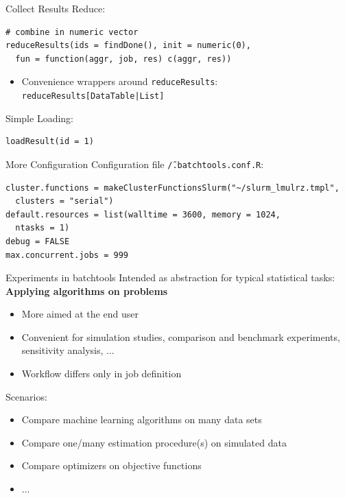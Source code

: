 \documentclass[11pt,compress,t,notes=noshow, aspectratio=169, xcolor=table]{beamer}
\begin{document}
\begin{frame}[fragile]{Collect Results}
  Reduce:
  
\begin{lstlisting}
# combine in numeric vector
reduceResults(ids = findDone(), init = numeric(0),
  fun = function(aggr, job, res) c(aggr, res))
\end{lstlisting}
  
  \begin{itemize}
    \item Convenience wrappers around \texttt{reduceResults}: \texttt{reduceResults[DataTable|List]}
  \end{itemize}
  Simple Loading:
  
\begin{lstlisting}
loadResult(id = 1)
\end{lstlisting}
  
\end{frame}

\begin{frame}[fragile]{More Configuration}
  Configuration file \texttt{\~/.batchtools.conf.R}:
  
\begin{lstlisting}
cluster.functions = makeClusterFunctionsSlurm("~/slurm_lmulrz.tmpl",
  clusters = "serial")
default.resources = list(walltime = 3600, memory = 1024,
  ntasks = 1)
debug = FALSE
max.concurrent.jobs = 999
\end{lstlisting}
  
\end{frame}

\begin{frame}[fragile]{Experiments in batchtools}
  Intended as abstraction for typical statistical tasks:
  \textbf{Applying algorithms on problems}
  \begin{itemize}
    \item More aimed at the end user
    \item Convenient for simulation studies, comparison and benchmark experiments, sensitivity analysis, ...
    \item Workflow differs only in job definition
  \end{itemize}
  Scenarios:
  \begin{itemize}
    \item Compare machine learning algorithms on many data sets
    \item Compare one/many estimation procedure(s) on simulated data
    \item Compare optimizers on objective functions
    \item ...
  \end{itemize}
\end{frame}
\end{document}
